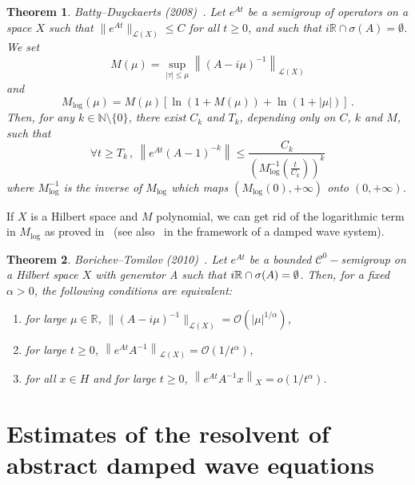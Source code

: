 \documentclass[10pt]{amsart}
\newtheorem{theo}{Theorem}[section]
\theoremstyle{definition}\newtheorem{defi}[theo]{Definition}\newtheorem{rema}[theo]{Remark}\newtheorem{exam}[theo]{Example}\newtheorem{exem}[theo]{Example}\newtheorem{nota}[theo]{Notation}
\newcommand{\RR}{\mathbb{R}}
\newcommand{\NN}{\mathbb{N}}
\newcommand{\Cc}{\mathcal{C}}
\newcommand{\Lc}{\mathcal{L}}
\newcommand{\Oc}{\mathcal{O}}
\newcommand*{\romanenumi}{\renewcommand*{\theenumi}{\roman{enumi}}}
\let\oldforall\forall
\renewcommand*{\forall}{\mathrel{\oldforall}}
\begin{document}
\begin{theo}\label{th-BD}
\emph{Batty--Duyckaerts (2008)~\cite[Theorem~1.5]{Batty-Duyckaerts}.}
Let $e^{At}$ be a semigroup of operators on a space $X$ such that $\|e^{At}\|_{\Lc(X)}\leq C$ for all $t\geq 0$, and such that $i\RR\cap
\sigma(A)=\emptyset$. We set
\[
M(\mu)=\sup_{|\tau|\leq \mu} \left\|(A-i\mu)^{-1}\right\|_{\Lc(X)}
\]
and
\[
M_{\log}(\mu)=M(\mu)[\ln(1+M(\mu))+\ln(1+|\mu|)]\,.
\]
Then, for any $k\in\NN\setminus\{0\}$, there exist $C_k$ and $T_k$, depending only on $C$, $k$ and $M$, such that
\[
\forall t\geq T_k\,,\:\left\|e^{At}(A-1)^{-k}\right\|\leq
\frac{C_k}{\left(M^{-1}_{\log}\left(\frac t{C_k}\right)\right)^k}
\]
where $M^{-1}_{\log}$ is the inverse of $M_{\log}$ which maps $(M_{\log}(0),+\infty)$ onto $(0,+\infty)$.
\end{theo}

If $X$ is a Hilbert space and $M$ polynomial, we can get rid of the logarithmic term in $M_{\log}$ as proved in~\cite{Bor-Tom} (see also~\cite{Ana-Leau} in the framework of a damped wave system).

\begin{theo}\label{th-BT}
\emph{Borichev--Tomilov (2010)~\cite[Theorem~2.4]{Bor-Tom}.}
Let $e^{At}$ be a bounded $\Cc^0-$semigroup on a Hilbert space $X$ with generator A such that $i\RR \cap \sigma(A)\linebreak=\emptyset$. Then, for a fixed $\alpha>0$, the following conditions are equivalent:
\begin{enumerate}\romanenumi
\item \label{listtheoA.4.1}for large $\mu\in\RR$, $\|(A-i\mu)^{-1}\|_{\Lc(X)} =
\Oc(|\mu|^{1/\alpha})$,
\item \label{listtheoA.4.2}for large $t\geq 0$, $\left\|e^{At}A^{-1}\right\|_{\Lc(X)} = \Oc(1/{t^{\alpha}})$,
\item \label{listtheoA.4.3}for all $x\in H$ and for large $t\geq 0$, $\left\|e^{At}A^{-1}x\right\|_{X} = o(1/{t^{\alpha}})$.
\end{enumerate}
\end{theo}


\section{Estimates of the resolvent of abstract damped wave equations}\label{section-appendix1}
\end{document}
